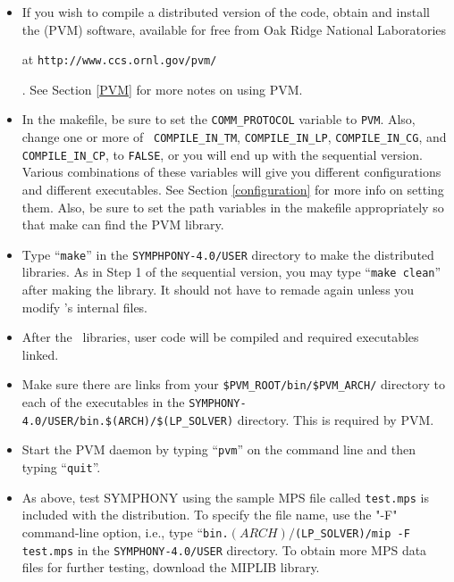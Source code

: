 \begin{itemize}
        \item If you wish to compile a distributed version of the code, obtain
and install the {\em {}} (PVM) software, available for free
from Oak Ridge National Laboratories
\begin{latexonly}
        at {\tt http://www.ccs.ornl.gov/pvm/}
\end{latexonly}. 
        See Section \ref{PVM} for more notes on using PVM.
        
        \item In the makefile, be sure to set the {\tt COMM\_PROTOCOL}
        variable to {\tt PVM}. Also, change one or more of {\tt
        COMPILE\_IN\_TM}, {\tt COMPILE\_IN\_LP}, {\tt COMPILE\_IN\_CG}, and
        {\tt COMPILE\_IN\_CP}, to {\tt FALSE}, or you will end up with the
        sequential version. Various combinations of these variables will give
        you different configurations and different executables. See Section
        \ref{configuration} for more info on setting them. Also, be sure to
        set the path variables in the makefile appropriately so that make can
        find the PVM library.

        \item Type ``{\tt make}'' in the \texttt{SYMPHPONY-4.0/USER} directory to
        make the distributed libraries. As in Step 1 of the sequential
        version, you may type ``{\tt make clean}'' after making the
        library. It should not have to remade again unless you modify
        \BB's internal files.

        \item After the \BB\ libraries, user code will be compiled and
        required executables linked.

        \item Make sure there are links from your
        \texttt{\$PVM\_ROOT/bin/\$PVM\_ARCH/} directory to each of the
        executables in the
        \texttt{SYMPHONY-4.0/USER/bin.\$(ARCH)/\$(LP\_SOLVER)} directory. 
	This is required by PVM.

        \item Start the PVM daemon by typing ``{\tt pvm}'' on the command line
        and then typing ``{\tt quit}''.

        \item As above, test SYMPHONY using the sample MPS file called
        \texttt{test.mps} is included with the distribution. To specify the
        file name, use the "-F" command-line option, i.e., type
        ``\texttt{bin.$(ARCH)/$(LP\_SOLVER)/mip -F test.mps} in the
        \texttt{SYMPHONY-4.0/USER} directory. To obtain more MPS data files
        for further testing, download the MIPLIB library.

\end{itemize}

